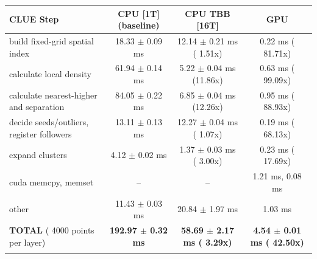     \begin{tabular}{l|c|c|c}
    \hline
    CLUE Step                                 & CPU [1T] (baseline)         & CPU TBB [16T]                         & GPU                       \\ \hline
    build fixed-grid spatial index            &  18.33 $\pm$  0.09 ms       &  12.14 $\pm$  0.21 ms ( 1.51x)        &   0.22 ms ( 81.71x)       \\
    calculate local density                   &  61.94 $\pm$  0.14 ms       &   5.22 $\pm$  0.04 ms (11.86x)        &   0.63 ms ( 99.09x)       \\
    calculate nearest-higher and separation   &  84.05 $\pm$  0.22 ms       &   6.85 $\pm$  0.04 ms (12.26x)        &   0.95 ms ( 88.93x)       \\
    decide seeds/outliers, register followers &  13.11 $\pm$  0.13 ms       &  12.27 $\pm$  0.04 ms ( 1.07x)        &   0.19 ms ( 68.13x)       \\
    expand clusters                           &   4.12 $\pm$  0.02 ms       &   1.37 $\pm$  0.03 ms ( 3.00x)        &   0.23 ms ( 17.69x)       \\ \hline
    cuda memcpy, memset                       & --                          & --                                    &   1.21 ms,   0.08 ms      \\
    other                                     &  11.43 $\pm$  0.03 ms       &  20.84 $\pm$  1.97 ms                 &   1.03 ms                 \\ \hline
    \textbf{TOTAL} ( 4000 points per layer)   & \textbf{192.97 $\pm$  0.32 ms} & \textbf{ 58.69 $\pm$  2.17 ms ( 3.29x)} & \textbf{  4.54 $\pm$  0.01 ms ( 42.50x)}  \\
    \hline
    \multicolumn{4}{c}{}
    \end{tabular}
    \linebreak


